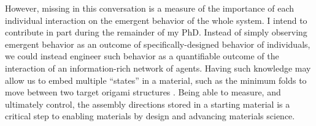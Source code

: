 \documentclass[11pt, oneside]{article}   	%
\begin{document}
However, missing in this conversation is a measure of the importance of each individual interaction on the emergent behavior of the whole system.
I intend to contribute in part during the remainder of my PhD.
Instead of simply observing emergent behavior as an outcome of specifically-designed behavior of individuals, we could instead engineer such behavior as a quantifiable outcome of the interaction of an information-rich network of agents.
Having such knowledge may allow us to embed multiple ``states'' in a material, such as the minimum folds to move between two target origami structures \cite{An_2011_Robotica}.
Being able to measure, and ultimately control, the assembly directions stored in a starting material is a critical step to enabling materials by design and advancing materials science.

\newpage


\end{document}
